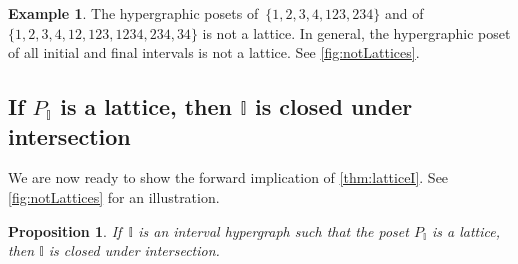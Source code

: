 \documentclass[reqno]{amsart}
\newtheorem{proposition}[theorem]{Proposition}
\theoremstyle{definition}
\newtheorem{example}[theorem]{Example}
\newcommand{\II}{\mathbb I} %
\begin{document}
\begin{example}
The hypergraphic posets of~$\{1, 2, 3, 4, 123, 234\}$ and of~$\{ 1, 2, 3, 4, 12, 123, 1234, 234, 34\}$ is not a lattice.
In general, the hypergraphic poset of all initial and final intervals is not a lattice.
See \cref{fig:notLattices}.
\end{example}


\subsection{If $P_\II$ is a lattice, then $\II$ is closed under intersection}  
\label{subsec:latticeForward}

We are now ready to show the forward implication of \cref{thm:latticeI}.
See \cref{fig:notLattices} for an illustration.

\begin{proposition}
\label{prop:latticeForward}
If~$\II$ is an interval  hypergraph such that the poset $P_\II$ is a lattice, then $\II$ is closed under intersection.
\end{proposition}
\end{document}
